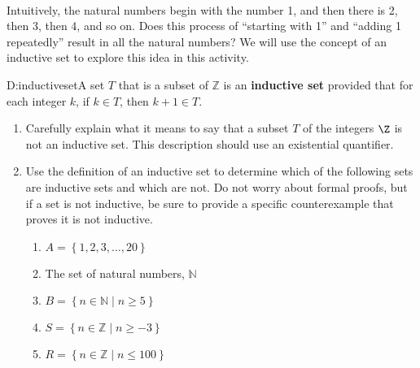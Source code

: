 \begin{previewactivity} \label{PA:propertyofN} \hfill \\
Intuitively, the natural numbers begin with the number  1, and then there is 2, then 3, then 4, and so on.  Does this process of ``starting with 1'' and ``adding 1 repeatedly'' result in all the natural numbers?  We will use the concept of an inductive set to explore this idea in this activity.

\begin{defbox}{D:inductiveset}{A set  $T$  that is a subset of  $\mathbb{Z}$ is an 
\textbf{inductive set}
%
 provided that for each integer $k$, if $k \in T$, then  $k + 1 \in T$.}
\end{defbox}


\begin{enumerate}
  \item Carefully explain what it means to say that a subset $T$ of the integers $\Z$ is not an inductive set.  This description should use an existential quantifier.

\item Use the definition of an inductive set to determine which of the following sets are inductive sets and which are not.  Do not worry about formal proofs, but if a set is  not inductive, be sure to provide a specific counterexample that proves it is not inductive.

\begin{multicols}{2}
\begin{enumerate}
\item $A = \left\{ {1,2,3, \ldots ,20} \right\}$

\item The set of natural numbers, $\mathbb{N}$

\item $B = \left\{ { {n \in \mathbb{N}} \mid n \geq 5} \right\}$
 
\item $S = \left\{ { {n \in \mathbb{Z}} \mid n \geq  - 3} \right\}$
 
\item $R = \left\{ { {n \in \mathbb{Z}} \mid n \leq  100} \right\}$


\end{enumerate}
\end{multicols}
\end{enumerate}
\end{previewactivity}

